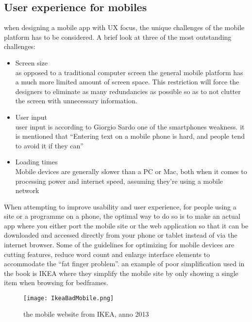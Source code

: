 \subsection{User experience for mobiles}
when designing a mobile app with UX focus, the unique challenges of the mobile platform has to be considered. A brief look at three of the most outstanding challenges:
\begin{itemize}
\item Screen size\\
as opposed to a traditional computer screen the general mobile platform has a much more limited amount of screen space. This restriction will force the designers to eliminate as many redundancies as possible so as to not clutter the screen with unnecessary information. \cite{Sardo}
\item User input\\
user input is according to Giorgio Sardo one of  the smartphones weakness. it is mentioned that “Entering text on a mobile phone is hard, and people tend to avoid it if they can”\cite{Sardo}
\item Loading times\\
Mobile devices are generally slower than a PC or Mac, both when it comes to processing power and internet speed, assuming they’re using a mobile network \cite{MobileUsability}
\end{itemize}
When attempting to improve usability and user experience, for people using a site or a programme on a phone, the optimal way to do so is to make an actual app where you either port the mobile site or the web application so that it can be downloaded and accessed directly from your phone or tablet instead of via the internet browser. 
Some of the guidelines for optimizing for mobile devices are cutting features, reduce word count and enlarge interface elements to accommodate the “fat finger problem”.\cite{MobileUsability} an example of poor simplification used in the book is IKEA where they simplify the mobile site by only showing a single item when browsing for bedframes.

\begin{figure}[H]
\centering
\texttt{[image: IkeaBadMobile.png]}
\caption{the mobile website from IKEA, anno 2013}
\end{figure}

